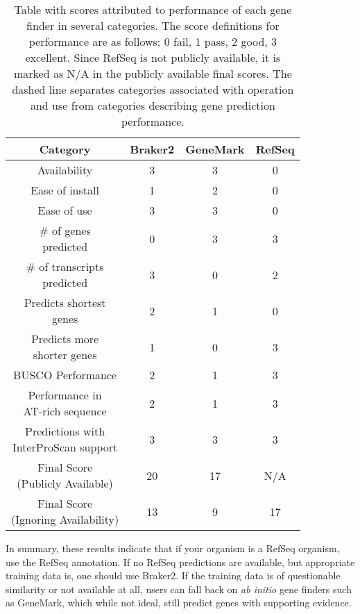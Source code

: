 \begin{table}
  \centering
  \begin{tabular}{|c|c|c|c|}
    \hline
    Category & Braker2 & GeneMark & RefSeq \\ \hline
    Availability & 3 & 3 & 0 \\ \hline
    Ease of install & 1 & 2 & 0 \\ \hline
    Ease of use & 3 & 3 & 0 \\ \hdashline
    \makecell{\# of genes\\predicted} & 0 & 3 & 3 \\ \hline
    \makecell{\# of transcripts\\predicted} & 3 & 0 & 2 \\ \hline
    \makecell{Predicts shortest\\genes} & 2 & 1 & 0 \\ \hline
    \makecell{Predicts more\\shorter genes} & 1 & 0 & 3 \\ \hline
    BUSCO Performance & 2 & 1 & 3 \\ \hline
    \makecell{Performance in\\AT-rich sequence} & 2 & 1 & 3 \\ \hline
    \makecell{Predictions with \\InterProScan support} & 3 & 3 & 3 \\ \hline
    \makecell{Final Score\\(Publicly Available)} & 20 & 17 & N/A \\ \hline
    \makecell{Final Score\\(Ignoring Availability)} & 13 & 9 & 17 \\ \hline
  \end{tabular}
  \caption[Final scoring table]{Table with scores attributed to
    performance of each gene finder in several categories. The score
    definitions for performance are as follows: 0 \- fail, 1 \- pass, 2
    \- good, 3 \- excellent. Since RefSeq is not publicly available, it is
    marked as N/A in the publicly available final scores. The dashed
    line separates categories associated with operation and use
    from categories describing gene prediction performance.}\label{table:final-score}
\end{table}

In summary, these results indicate that if your organism is a RefSeq
organism, use the RefSeq annotation. If no RefSeq predictions are
available, but appropriate training data is, one should use Braker2. If
the training data is of questionable similarity or not available at
all, users can fall back on \textit{ab initio} gene finders such as
GeneMark, which while not ideal, still predict genes with supporting
evidence.

